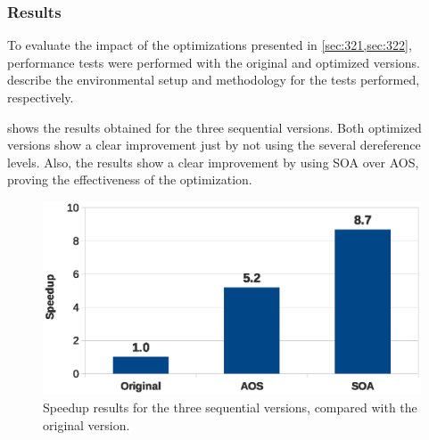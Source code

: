 \subsubsection{Results}


To evaluate the impact of the optimizations presented in \cref{sec:321,sec:322}, performance tests were performed with the original and optimized versions.
 describe the environmental setup and methodology for the tests performed, respectively.

 shows the results obtained for the three sequential versions.
Both optimized versions show a clear improvement just by not using the several dereference levels. Also, the results show a clear improvement by using SOA over AOS, proving the effectiveness of the optimization.

\begin{figure}[!htp]
	\centering
	\includegraphics[width=\columnwidth]{images/graph_comparison_seq.eps}
	\caption{Speedup results for the three sequential versions, compared with the original version.}
	\label{fig:seq:results}
\end{figure}
